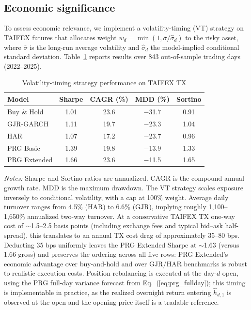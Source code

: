 \documentclass[11pt,a4paper]{article}
\begin{document}
\subsection{Economic significance}

To assess economic relevance, we implement a volatility-timing (VT) strategy on TAIFEX futures that allocates weight $w_d = \min(1, \bar{\sigma}/\hat{\sigma}_d)$ to the risky asset, where $\bar{\sigma}$ is the long-run average volatility and $\hat{\sigma}_d$ the model-implied conditional standard deviation. Table~\ref{tab:economic} reports results over 843 out-of-sample trading days (2022--2025).

\begin{table}[htbp]
\centering
\caption{Volatility-timing strategy performance on TAIFEX TX}
\label{tab:economic}
\small
\begin{tabular}{lcccc}
\toprule
Model & Sharpe & CAGR (\%) & MDD (\%) & Sortino \\
\midrule
Buy \& Hold     & 1.01 & 23.6 & $-$31.7 & 0.91 \\
GJR-GARCH       & 1.11 & 19.7 & $-$23.3 & 1.04 \\
HAR             & 1.07 & 17.2 & $-$23.7 & 0.96 \\
PRG Basic       & 1.39 & 19.8 & $-$13.9 & 1.33 \\
PRG Extended    & 1.66 & 23.6 & $-$11.5 & 1.65 \\
\bottomrule
\end{tabular}
\begin{flushleft}
\footnotesize
\emph{Notes:} Sharpe and Sortino ratios are annualized. CAGR is the compound annual growth rate. MDD is the maximum drawdown. The VT strategy scales exposure inversely to conditional volatility, with a cap at 100\% weight. Average daily turnover ranges from 4.5\% (HAR) to 6.6\% (GJR), implying roughly 1{,}100--1{,}650\% annualized two-way turnover. At a conservative TAIFEX TX one-way cost of $\sim$1.5--2.5 basis points (including exchange fees and typical bid--ask half-spread), this translates to an annual TX cost drag of approximately 35--80 bps. Deducting 35 bps uniformly leaves the PRG Extended Sharpe at $\sim$1.63 (versus 1.66 gross) and preserves the ordering across all five rows: PRG Extended's economic advantage over buy-and-hold and over GJR/HAR benchmarks is robust to realistic execution costs. Position rebalancing is executed at the day-$d$ open, using the PRG full-day variance forecast from Eq.~(\ref{eq:prg_fullday}); this timing is implementable in practice, as the realized overnight return entering $\hat{h}_{d,1}$ is observed at the open and the opening price itself is a tradable reference.
\end{flushleft}
\end{table}
\end{document}
